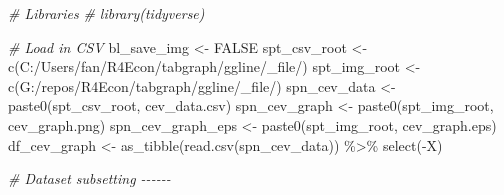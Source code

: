 \documentclass[
]{book}
\newenvironment{Shaded}{\begin{snugshade}}{\end{snugshade}}
\newcommand{\CommentTok}[1]{\textcolor[rgb]{0.56,0.35,0.01}{\textit{#1}}}
\newcommand{\ConstantTok}[1]{\textcolor[rgb]{0.00,0.00,0.00}{#1}}
\newcommand{\FunctionTok}[1]{\textcolor[rgb]{0.00,0.00,0.00}{#1}}
\newcommand{\NormalTok}[1]{#1}
\newcommand{\OtherTok}[1]{\textcolor[rgb]{0.56,0.35,0.01}{#1}}
\newcommand{\SpecialCharTok}[1]{\textcolor[rgb]{0.00,0.00,0.00}{#1}}
\newcommand{\StringTok}[1]{\textcolor[rgb]{0.31,0.60,0.02}{#1}}
\begin{document}
\begin{Shaded}
\begin{Highlighting}[]
\CommentTok{\# Libraries}
\CommentTok{\# library(tidyverse)}

\CommentTok{\# Load in CSV}
\NormalTok{bl\_save\_img }\OtherTok{\textless{}{-}} \ConstantTok{FALSE}
\NormalTok{spt\_csv\_root }\OtherTok{\textless{}{-}} \FunctionTok{c}\NormalTok{(}\StringTok{\textquotesingle{}C:/Users/fan/R4Econ/tabgraph/ggline/\_file/\textquotesingle{}}\NormalTok{)}
\NormalTok{spt\_img\_root }\OtherTok{\textless{}{-}} \FunctionTok{c}\NormalTok{(}\StringTok{\textquotesingle{}G:/repos/R4Econ/tabgraph/ggline/\_file/\textquotesingle{}}\NormalTok{)}
\NormalTok{spn\_cev\_data }\OtherTok{\textless{}{-}} \FunctionTok{paste0}\NormalTok{(spt\_csv\_root, }\StringTok{\textquotesingle{}cev\_data.csv\textquotesingle{}}\NormalTok{)}
\NormalTok{spn\_cev\_graph }\OtherTok{\textless{}{-}} \FunctionTok{paste0}\NormalTok{(spt\_img\_root, }\StringTok{\textquotesingle{}cev\_graph.png\textquotesingle{}}\NormalTok{)}
\NormalTok{spn\_cev\_graph\_eps }\OtherTok{\textless{}{-}} \FunctionTok{paste0}\NormalTok{(spt\_img\_root, }\StringTok{\textquotesingle{}cev\_graph.eps\textquotesingle{}}\NormalTok{)}
\NormalTok{df\_cev\_graph }\OtherTok{\textless{}{-}} \FunctionTok{as\_tibble}\NormalTok{(}\FunctionTok{read.csv}\NormalTok{(spn\_cev\_data)) }\SpecialCharTok{\%\textgreater{}\%} \FunctionTok{select}\NormalTok{(}\SpecialCharTok{{-}}\NormalTok{X)}

\CommentTok{\# Dataset subsetting {-}{-}{-}{-}{-}{-}}


\end{Highlighting}
\end{Shaded}
\end{document}
